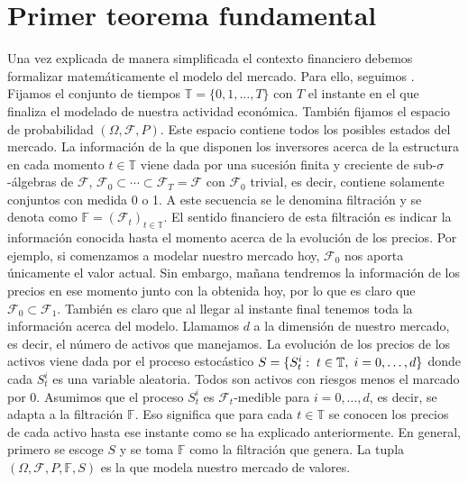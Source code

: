 \section{Primer teorema fundamental}
Una vez explicada de manera simplificada el contexto financiero debemos formalizar matemáticamente el modelo del mercado. Para ello, seguimos \cite{elliot1999mathematics}. Fijamos el conjunto de tiempos $ \mathbb{T} = \{0,1,\dots,T\}$ con $ T $ el instante en el que finaliza el modelado de nuestra actividad económica. También fijamos el espacio de probabilidad $ (\Omega, \mathcal{F}, P) $. Este espacio contiene todos los posibles estados del mercado. La información de la que disponen los inversores acerca de la estructura en cada momento $ t \in \mathbb{T}$ viene dada por una sucesión finita y creciente de sub-$ \sigma $-álgebras de $ \mathcal{F} $, $ \mathcal{F}_0 \subset \cdots \subset \mathcal{F}_T = \mathcal{F} $ con $ \mathcal{F}_0 $ trivial, es decir, contiene solamente conjuntos con medida 0 o 1. A este secuencia se le denomina filtración y se denota como $ \mathbb{F} = (\mathcal{F}_t)_{t \in \mathbb{T}} $. El sentido financiero de esta filtración es indicar la información conocida hasta el momento acerca de la evolución de los precios. Por ejemplo, si comenzamos a modelar nuestro mercado hoy, $ \mathcal{F}_0 $ nos aporta únicamente el valor actual. Sin embargo, mañana tendremos la información de los precios en ese momento junto con la obtenida hoy, por lo que es claro que $ \mathcal{F}_0 \subset \mathcal{F}_1  $. También es claro que al llegar al instante final tenemos toda la información acerca del modelo. Llamamos $ d  $ a la dimensión de nuestro mercado, es decir, el número de activos que manejamos. La evolución de los precios de los activos viene dada  por el proceso estocástico $ S = \{S^i_t:\hspace{1mm} t \in \mathbb{T},\hspace{1mm} i=0,\dots,d\} $ donde cada $ S^i_t $ es una variable aleatoria. Todos son activos con riesgos menos el marcado por $ 0 $. Asumimos que el proceso $ S_t^i $ es $ \mathcal{F}_t $-medible para $ i=0,\dots,d $, es decir, se adapta a la filtración $ \mathbb{F} $. Eso significa que para cada $ t \in \mathbb{T} $ se conocen los precios de cada activo hasta ese instante como se ha explicado anteriormente. En general, primero se escoge $ S $ y se toma $ \mathbb{F} $ como la filtración que genera. La tupla $ (\Omega, \mathcal{F}, P, \mathbb{F}, S) $ es la que modela nuestro mercado de valores. \\

